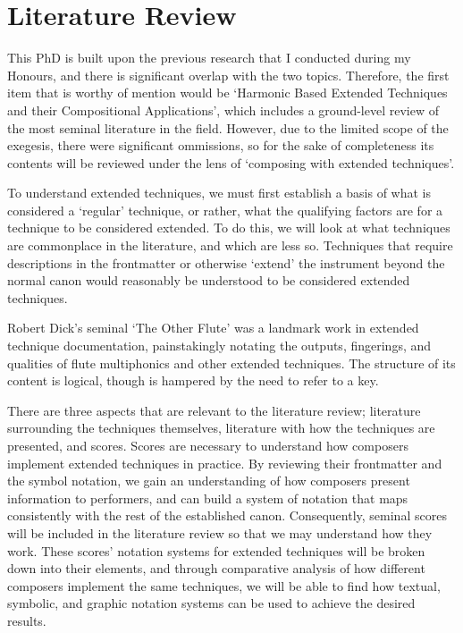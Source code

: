 \section{Literature Review}
This PhD is built upon the previous research that I conducted during my Honours, and there is significant overlap with the two topics.
Therefore, the first item that is worthy of mention would be `Harmonic Based Extended Techniques and their Compositional Applications', which includes a ground-level review of the most seminal literature in the field.
However, due to the limited scope of the exegesis, there were significant ommissions, so for the sake of completeness its contents will be reviewed under the lens of `composing with extended techniques'.

To understand extended techniques, we must first establish a basis of what is considered a `regular' technique, or rather, what the qualifying factors are for a technique to be considered extended.
To do this, we will look at what techniques are commonplace in the literature, and which are less so.
Techniques that require descriptions in the frontmatter or otherwise `extend' the instrument beyond the normal canon would reasonably be understood to be considered extended techniques.



Robert Dick's seminal `The Other Flute' was a landmark work in extended technique documentation, painstakingly notating the outputs, fingerings, and qualities of flute multiphonics and other extended techniques.\autocite{dickOtherFlute1989}
The structure of its content is logical, though is hampered by the need to refer to a key.

There are three aspects that are relevant to the literature review; literature surrounding the techniques themselves, literature with how the techniques are presented, and scores. 
Scores are necessary to understand how composers implement extended techniques in practice.
By reviewing their frontmatter and the symbol notation, we gain an understanding of how composers present information to performers, and can build a system of notation that maps consistently with the rest of the established canon.
Consequently, seminal scores will be included in the literature review so that we may understand how they work. 
These scores' notation systems for extended techniques will be broken down into their elements, and through comparative analysis of how different composers implement the same techniques, we will be able to find how textual, symbolic, and graphic notation systems can be used to achieve the desired results.

